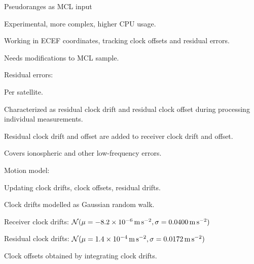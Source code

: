 \begin{compactitem}
\item
Pseudoranges as MCL input
\begin{compactitem}
    \item
    Experimental, more complex, higher CPU usage.

    \item
    Working in ECEF coordinates, tracking clock offsets and residual errors.

    \item
    Needs modifications to MCL sample.

    \item
    Residual errors:
    \begin{compactitem}
        \item Per satellite.
        \item Characterized as residual clock drift and residual clock offset
              during processing individual measurements.
        \item Residual clock drift and offset are added to receiver clock drift and offset.
        \item Covers ionospheric and other low-frequency errors.
    \end{compactitem}

    \item
    Motion model:
    \begin{compactitem}
        \item Updating clock drifts, clock offsets, residual drifts.
        \item Clock drifts modelled as Gaussian random walk.
        \begin{compactitem}
            \item Receiver clock drifts:
                  \(\operatorname{\mathcal{N}}(\mu = \SI{-8.2e-06}{\meter\per\second\squared}, \sigma = \SI{0.0400}{\meter\per\second\squared})\)
            \item Residual clock drifts:
                  \(\operatorname{\mathcal{N}}(\mu = \SI{1.4e-4}{\meter\per\second\squared}, \sigma = \SI{0.0172}{\meter\per\second\squared})\)
        \end{compactitem}
        \item Clock offsets obtained by integrating clock drifts.
        \item {}
    \end{compactitem}


\end{compactitem}
\end{compactitem}
